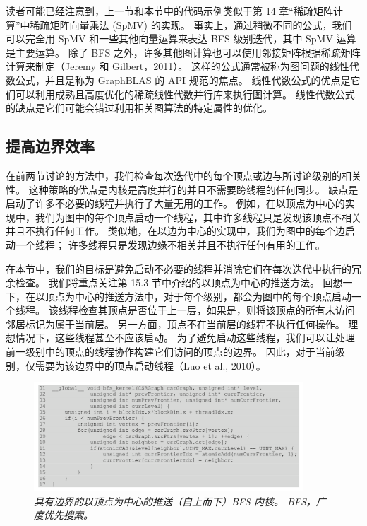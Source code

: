 读者可能已经注意到，上一节和本节中的代码示例类似于第 14 章“稀疏矩阵计算”中稀疏矩阵向量乘法 (SpMV) 的实现。 
事实上，通过稍微不同的公式，我们可以完全用 SpMV 和一些其他向量运算来表达 BFS 级别迭代，其中 SpMV 运算是主要运算。 
除了 BFS 之外，许多其他图计算也可以使用邻接矩阵根据稀疏矩阵计算来制定（Jeremy 和 Gilbert，2011）。 
这样的公式通常被称为图问题的线性代数公式，并且是称为 GraphBLAS 的 API 规范的焦点。 
线性代数公式的优点是它们可以利用成熟且高度优化的稀疏线性代数并行库来执行图计算。 
线性代数公式的缺点是它们可能会错过利用相关图算法的特定属性的优化。

\subsection{提高边界效率}
在前两节讨论的方法中，我们检查每次迭代中的每个顶点或边与所讨论级别的相关性。 
这种策略的优点是内核是高度并行的并且不需要跨线程的任何同步。 缺点是启动了许多不必要的线程并执行了大量无用的工作。 
例如，在以顶点为中心的实现中，我们为图中的每个顶点启动一个线程，其中许多线程只是发现该顶点不相关并且不执行任何工作。 
类似地，在以边为中心的实现中，我们为图中的每个边启动一个线程； 许多线程只是发现边缘不相关并且不执行任何有用的工作。

在本节中，我们的目标是避免启动不必要的线程并消除它们在每次迭代中执行的冗余检查。 
我们将重点关注第 15.3 节中介绍的以顶点为中心的推送方法。 
回想一下，在以顶点为中心的推送方法中，对于每个级别，都会为图中的每个顶点启动一个线程。 
该线程检查其顶点是否位于上一层，如果是，则将该顶点的所有未访问邻居标记为属于当前层。 
另一方面，顶点不在当前层的线程不执行任何操作。 理想情况下，这些线程甚至不应该启动。 
为了避免启动这些线程，我们可以让处理前一级别中的顶点的线程协作构建它们访问的顶点的边界。 
因此，对于当前级别，仅需要为该边界中的顶点启动线程（Luo et al., 2010）。

\begin{figure}[H]
	\centering
	\includegraphics[width=0.9\textwidth]{figs/F15.12.png}
	\caption{\textit{具有边界的以顶点为中心的推送（自上而下）BFS 内核。 BFS，广度优先搜索。}}
\end{figure}


